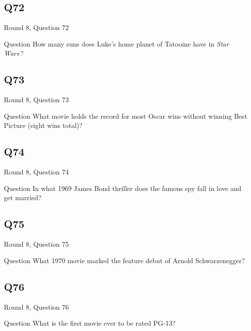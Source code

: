 \documentclass[11pt]{beamer}
\begin{document}
\subsection*{Q72}
\begin{frame}[t]{Round 8, Question 72}
\vspace{2em}
\begin{block}{Question}
How many suns does Luke's home planet of Tatooine have in \emph{Star Wars}\,?
\end{block}
\end{frame}
    

\subsection*{Q73}
\begin{frame}[t]{Round 8, Question 73}
\vspace{2em}
\begin{block}{Question}
What movie holds the record for most Oscar wins without winning Best Picture (eight wins total)?
\end{block}
\end{frame}
    

\subsection*{Q74}
\begin{frame}[t]{Round 8, Question 74}
\vspace{2em}
\begin{block}{Question}
In what 1969 James Bond thriller does the famous spy fall in love and get married?
\end{block}
\end{frame}
    

\subsection*{Q75}
\begin{frame}[t]{Round 8, Question 75}
\vspace{2em}
\begin{block}{Question}
What 1970 movie marked the feature debut of Arnold Schwarzenegger?
\end{block}
\end{frame}
    

\subsection*{Q76}
\begin{frame}[t]{Round 8, Question 76}
\vspace{2em}
\begin{block}{Question}
What is the first movie ever to be rated PG-13?
\end{block}
\end{frame}
    
\end{document}
